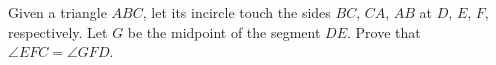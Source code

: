 Given a triangle $ABC$,  let its incircle touch the sides $BC$,  $CA$,  $AB$ at $D$,  $E$,  $F$,  respectively.  Let $G$ be the midpoint of the segment $DE$.  Prove that $\angle EFC = \angle GFD$.